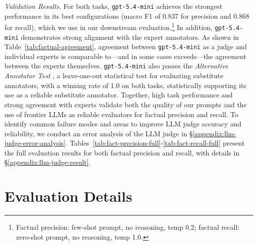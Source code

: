 \documentclass{article}
\begin{document}
\textit{Validation Results.} 
For both tasks, \texttt{gpt-5.4-mini} achieves the strongest performance in its best configurations (macro F1 of 0.837 for precision and 0.868 for recall), which we use in our downstream evaluation.\footnote{Factual precision: few-shot prompt, no reasoning, temp 0.2; factual recall: zero-shot prompt, no reasoning, temp 1.0.} In addition, \texttt{gpt-5.4-mini} demonstrates strong alignment with the expert annotators. As shown in Table~\ref{tab:factual-agreement}, agreement between \texttt{gpt-5.4-mini}  as a judge and individual experts is comparable to---and in some cases exceeds---the agreement between the experts themselves. \texttt{gpt-5.4-mini} also passes the \textit{Alternative Annotator Test} \cite{calderon-etal-2025-alternative}, a leave-one-out statistical test for evaluating substitute annotators, with a winning rate of 1.0 on both tasks, statistically supporting its use as a reliable substitute annotator. Together, high task performance and strong agreement with experts validate both the quality of our prompts and the use of frontier LLMs as reliable evaluators for factual precision and recall. To identify common failure modes and areas to improve LLM judge accuracy and reliability, we conduct an error analysis of the LLM judge in \S\ref{appendix:llm-judge-error-analysis}. Tables~\ref{tab:fact-precision-full}-\ref{tab:fact-recall-full} present the full evaluation results for both factual precision and recall, with details in \S\ref{appendix:llm-judge-result}. 




\section{Evaluation Details}\label{sec:evaluation-details}
\end{document}
